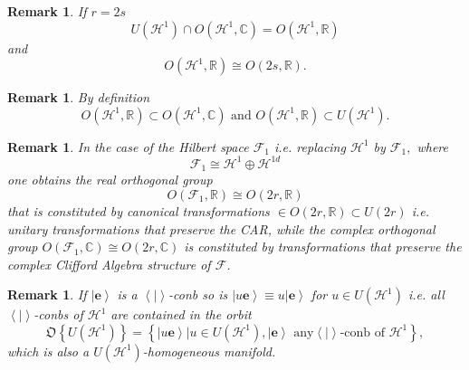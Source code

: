 \documentclass[aps,preprint]{revtex4}%
\newtheorem{remark}[theorem]{Remark}
\begin{document}
\begin{remark}
If $r=2s$%
\begin{equation}
U\left(  \mathcal{H}^{1}\right)  \cap O\left(  \mathcal{H}^{1},\mathbb{C}%
\right)  =O\left(  \mathcal{H}^{1},\mathbb{R}\right)
\end{equation}
and
\begin{equation}
O\left(  \mathcal{H}^{1},\mathbb{R}\right)  \cong O\left(  2s,\mathbb{R}%
\right)  .
\end{equation}

\end{remark}

\begin{remark}
By definition
\begin{equation}
O\left(  \mathcal{H}^{1},\mathbb{R}\right)  \subset O\left(  \mathcal{H}%
^{1},\mathbb{C}\right)  \text{ and }O\left(  \mathcal{H}^{1},\mathbb{R}%
\right)  \subset U\left(  \mathcal{H}^{1}\right)  .
\end{equation}

\end{remark}

\begin{remark}
In the case of the Hilbert space $\mathcal{F}_{1}$ i.e. replacing
$\mathcal{H}^{1}$ by $\mathcal{F}_{1},$ where
\begin{equation}
\mathcal{F}_{1}\cong\mathcal{H}^{1}\oplus\mathcal{H}^{1d}%
\end{equation}
one obtains the real orthogonal group
\begin{equation}
O\left(  \mathcal{F}_{1},\mathbb{R}\right)  \cong O\left(  2r,\mathbb{R}%
\right)
\end{equation}
that is constituted by canonical transformations $\in O\left(  2r,\mathbb{R}%
\right)  \subset U\left(  2r\right)  $ i.e. unitary transformations that
preserve the CAR, while the complex orthogonal group $O\left(  \mathcal{F}%
_{1},\mathbb{C}\right)  \cong O\left(  2r,\mathbb{C}\right)  $ is constituted
by transformations that preserve the complex Clifford Algebra structure of
$\mathcal{F}$.
\end{remark}

\begin{remark}
If $\left\vert \mathbf{e}\right\rangle $ is a $\left\langle \left.
{}\right\vert \right\rangle $-conb so is $\left\vert u\mathbf{e}\right\rangle
\equiv u\left\vert \mathbf{e}\right\rangle $ for $u\in U\left(  \mathcal{H}%
^{1}\right)  $ i.e. all $\left\langle \left.  {}\right\vert \right\rangle
$-conbs of $\mathcal{H}^{1}$ are contained in the orbit
\begin{equation}
\mathfrak{O}\left\{  U\left(  \mathcal{H}^{1}\right)  \right\}  =\left\{
\left.  \left\vert u\mathbf{e}\right\rangle \right\vert u\in U\left(
\mathcal{H}^{1}\right)  ,\left\vert \mathbf{e}\right\rangle \text{ any
}\left\langle \left.  {}\right\vert \right\rangle \text{-conb of }%
\mathcal{H}^{1}\right\}  ,
\end{equation}
which is also a $U\left(  \mathcal{H}^{1}\right)  $-homogeneous manifold.
\end{remark}
\end{document}
